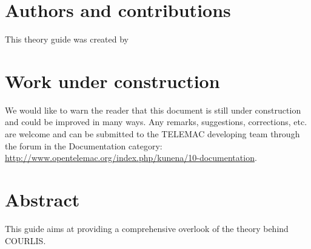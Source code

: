 \documentclass[Courlis]{../../data/TelemacDoc} %
\begin{document}
\let\cleardoublepage\clearpage

\title{\courlis}
\subtitle{Theory guide}
\version{\telmaversion}
\date{\today}
\maketitle
\clearpage


\newpage

\thispagestyle{empty}

\chapter*{Authors and contributions}
This theory guide was created by 

\newpage

\chapter*{Work under construction}\label{workunderconstruction}
We would like to warn the reader that this document is still under construction and
could be improved in many ways. Any remarks, suggestions, corrections, etc. are welcome
and can be submitted to the TELEMAC developing team through the forum in the Documentation
category: \url{http://www.opentelemac.org/index.php/kunena/10-documentation}.

\newpage

\chapter*{Abstract}\label{Abstract}
This guide aims at providing a comprehensive overlook of the theory behind COURLIS. 



\newpage

\thispagestyle{empty}

\TelemacCopyright{}
\end{document}
